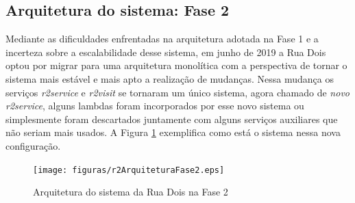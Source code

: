 %


\subsection{Arquitetura do sistema: Fase 2}

Mediante as dificuldades enfrentadas na arquitetura adotada na Fase 1 e a
incerteza sobre a escalabilidade desse sistema, em junho de 2019 a Rua Dois
optou por migrar para uma arquitetura monolítica com a perspectiva de tornar
o sistema mais estável e mais apto a realização de mudanças. Nessa mudança
os serviços \textit{r2service} e \textit{r2visit} se tornaram um único sistema,
agora chamado de \textit{novo r2service}, alguns lambdas foram incorporados por
esse novo sistema ou simplesmente foram descartados juntamente com alguns
serviços auxiliares que não seriam mais usados. A Figura
\ref{fig:ArquiteturaFase2} exemplifica como está o sistema nessa nova
configuração.

\begin{figure}[h]
  \centering
  \texttt{[image: figuras/r2ArquiteturaFase2.eps]}
  \caption{Arquitetura do sistema da Rua Dois na Fase 2}
  \label{fig:ArquiteturaFase2}
\end{figure}
